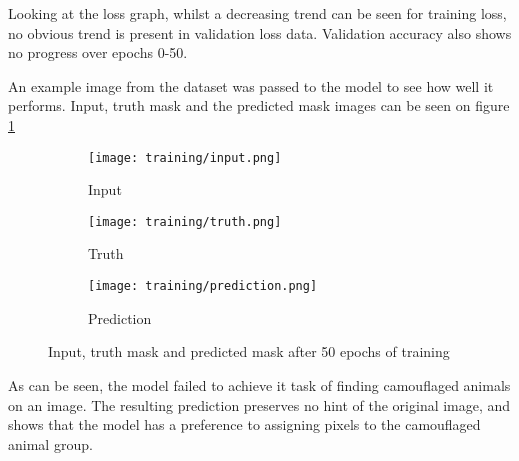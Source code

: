 \documentclass[../main.tex]{subfiles}
\begin{document}
Looking at the loss graph, whilst a decreasing trend can be seen for training loss, no obvious trend is present in validation loss data. Validation accuracy also shows no progress over epochs 0-50.

An example image from the dataset was passed to the model to see how well it performs. Input, truth mask and the predicted mask images can be seen on figure \ref{fig:training:image}

\begin{figure}
\centering

\begin{subfigure}{.3\textwidth}
    \centering
    \texttt{[image: training/input.png]}
    \caption{Input}
\end{subfigure}
\begin{subfigure}{.3\textwidth}
    \centering
    \texttt{[image: training/truth.png]}
    \caption{Truth}
\end{subfigure}
\begin{subfigure}{.3\textwidth}
    \centering
    \texttt{[image: training/prediction.png]}
    \caption{Prediction}
\end{subfigure}

\caption{Input, truth mask and predicted mask after 50 epochs of training}
\label{fig:training:image}

\end{figure}

As can be seen, the model failed to achieve it task of finding camouflaged animals on an image. The resulting prediction preserves no hint of the original image, and shows that the model has a preference to assigning pixels to the camouflaged animal group.
\end{document}
